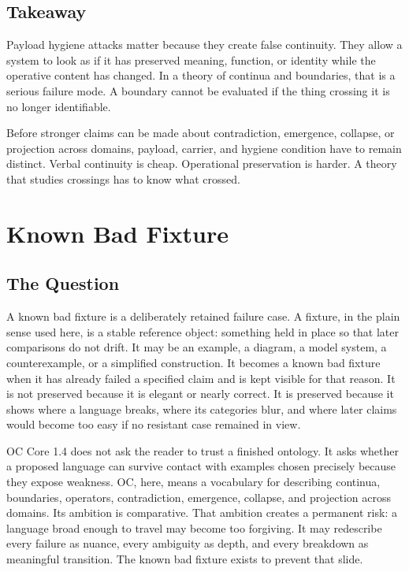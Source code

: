 \documentclass[11pt,a4paper,openany]{book}
\begin{document}
\subsection{Takeaway}
Payload hygiene attacks matter because they create false continuity. They allow a system to look as if it has preserved meaning, function, or identity while the operative content has changed. In a theory of continua and boundaries, that is a serious failure mode. A boundary cannot be evaluated if the thing crossing it is no longer identifiable. \cite{prigogine_dissipative,haken_synergetics}\par
Before stronger claims can be made about contradiction, emergence, collapse, or projection across domains, payload, carrier, and hygiene condition have to remain distinct. Verbal continuity is cheap. Operational preservation is harder. A theory that studies crossings has to know what crossed.\par
\section{Known Bad Fixture}
\subsection{The Question}
A known bad fixture is a deliberately retained failure case. A fixture, in the plain sense used here, is a stable reference object: something held in place so that later comparisons do not drift. It may be an example, a diagram, a model system, a counterexample, or a simplified construction. It becomes a known bad fixture when it has already failed a specified claim and is kept visible for that reason. It is not preserved because it is elegant or nearly correct. It is preserved because it shows where a language breaks, where its categories blur, and where later claims would become too easy if no resistant case remained in view. \cite{haken_synergetics,nicolis_prigogine_selforg}\par
OC Core 1.4 does not ask the reader to trust a finished ontology. It asks whether a proposed language can survive contact with examples chosen precisely because they expose weakness. OC, here, means a vocabulary for describing continua, boundaries, operators, contradiction, emergence, collapse, and projection across domains. Its ambition is comparative. That ambition creates a permanent risk: a language broad enough to travel may become too forgiving. It may redescribe every failure as nuance, every ambiguity as depth, and every breakdown as meaningful transition. The known bad fixture exists to prevent that slide.\par
\end{document}
